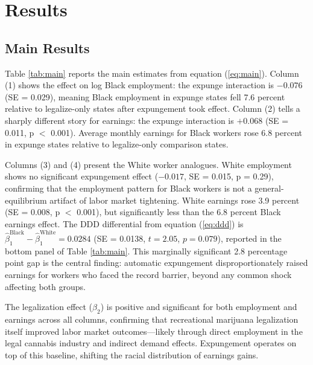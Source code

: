\documentclass[12pt]{article}
\begin{document}
\section{Results}

\subsection{Main Results}

Table \ref{tab:main} reports the main estimates from equation (\ref{eq:main}). Column (1) shows the effect on log Black employment: the expunge interaction is $-0.076$ (SE = 0.029), meaning Black employment in expunge states fell 7.6 percent relative to legalize-only states after expungement took effect. Column (2) tells a sharply different story for earnings: the expunge interaction is $+0.068$ (SE = 0.011, p $<$ 0.001). Average monthly earnings for Black workers rose 6.8 percent in expunge states relative to legalize-only comparison states.



Columns (3) and (4) present the White worker analogues. White employment shows no significant expungement effect ($-0.017$, SE = 0.015, p = 0.29), confirming that the employment pattern for Black workers is not a general-equilibrium artifact of labor market tightening. White earnings rose 3.9 percent (SE = 0.008, p $<$ 0.001), but significantly less than the 6.8 percent Black earnings effect. The DDD differential from equation (\ref{eq:ddd}) is $\hat{\beta}_1^{\text{Black}} - \hat{\beta}_1^{\text{White}} = 0.0284$ (SE = 0.0138, $t = 2.05$, $p = 0.079$), reported in the bottom panel of Table \ref{tab:main}. This marginally significant 2.8 percentage point gap is the central finding: automatic expungement disproportionately raised earnings for workers who faced the record barrier, beyond any common shock affecting both groups.

The legalization effect ($\beta_2$) is positive and significant for both employment and earnings across all columns, confirming that recreational marijuana legalization itself improved labor market outcomes---likely through direct employment in the legal cannabis industry and indirect demand effects. Expungement operates on top of this baseline, shifting the racial distribution of earnings gains.
\end{document}
